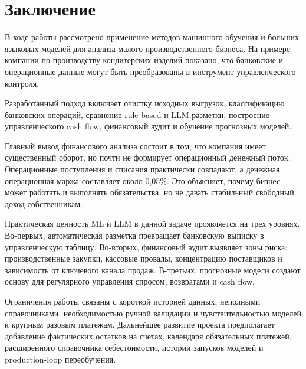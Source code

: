 \chapter*{Заключение}

В ходе работы рассмотрено применение методов машинного обучения и больших языковых моделей для анализа малого производственного бизнеса. На примере компании по производству кондитерских изделий показано, что банковские и операционные данные могут быть преобразованы в инструмент управленческого контроля.

Разработанный подход включает очистку исходных выгрузок, классификацию банковских операций, сравнение rule-based и LLM-разметки, построение управленческого cash flow, финансовый аудит и обучение прогнозных моделей.

Главный вывод финансового анализа состоит в том, что компания имеет существенный оборот, но почти не формирует операционный денежный поток. Операционные поступления и списания практически совпадают, а денежная операционная маржа составляет около 0,05\%. Это объясняет, почему бизнес может работать и выполнять обязательства, но не давать стабильный свободный доход собственникам.

Практическая ценность ML и LLM в данной задаче проявляется на трех уровнях. Во-первых, автоматическая разметка превращает банковскую выписку в управленческую таблицу. Во-вторых, финансовый аудит выявляет зоны риска: производственные закупки, кассовые провалы, концентрацию поставщиков и зависимость от ключевого канала продаж. В-третьих, прогнозные модели создают основу для регулярного управления спросом, возвратами и cash flow.

Ограничения работы связаны с короткой историей данных, неполными справочниками, необходимостью ручной валидации и чувствительностью моделей к крупным разовым платежам. Дальнейшее развитие проекта предполагает добавление фактических остатков на счетах, календаря обязательных платежей, расширенного справочника себестоимости, истории запусков моделей и production-loop переобучения.
